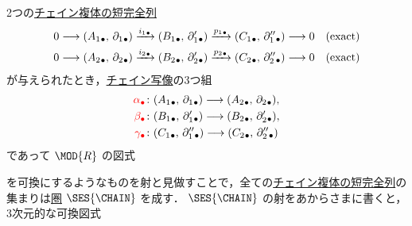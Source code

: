 \documentclass[algtopo_main]{subfiles}
\begin{document}
2つの\hyperref[def:chain-exact]{チェイン複体の短完全列}
\begin{align}
    0 &\longrightarrow (A_1{}_\bullet,\, \partial_1{}_\bullet) \xrightarrow{i_1{}_\bullet} (B_1{}_\bullet,\, \partial'_1{}_\bullet) \xrightarrow{p_1{}_\bullet} (C_1{}_\bullet,\, \partial''_1{}_\bullet) \longrightarrow 0\quad (\text{exact}) \\
    0 &\longrightarrow (A_2{}_\bullet,\, \partial_2{}_\bullet) \xrightarrow{i_2{}_\bullet} (B_2{}_\bullet,\, \partial'_2{}_\bullet) \xrightarrow{p_2{}_\bullet} (C_2{}_\bullet,\, \partial''_2{}_\bullet) \longrightarrow 0\quad (\text{exact})
\end{align}
が与えられたとき，\hyperref[def:chainmap]{チェイン写像}の3つ組
\begin{align}
    \textcolor{red}{\alpha_\bullet} &\colon (A_1{}_\bullet,\, \partial_1{}_\bullet) \longrightarrow (A_2{}_\bullet,\, \partial_2{}_\bullet), \\
    \textcolor{red}{\beta_\bullet }&\colon (B_1{}_\bullet,\, \partial'_1{}_\bullet) \longrightarrow (B_2{}_\bullet,\, \partial'_2{}_\bullet), \\
    \textcolor{red}{\gamma_\bullet} &\colon (C_1{}_\bullet,\, \partial''_1{}_\bullet) \longrightarrow (C_2{}_\bullet,\, \partial''_2{}_\bullet)
\end{align}
であって $\MOD{R}$ の図式
\begin{center}
\end{center}
を可換にするようなものを射と見做すことで，全ての\hyperref[def:chain-exact]{チェイン複体の短完全列}の集まりは\hyperref[def:category]{圏} $\SES{\CHAIN}$ を成す．
$\SES{\CHAIN}$ の射をあからさまに書くと，3次元的な可換図式
\end{document}
